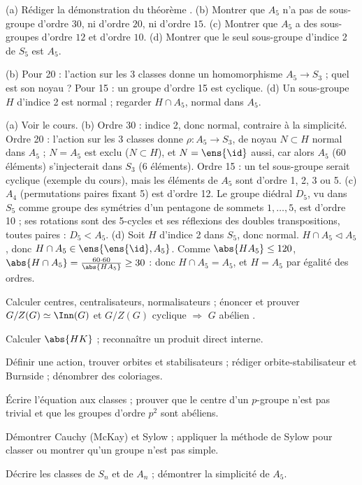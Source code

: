 \begin{exo}
(a) Rédiger la démonstration du théorème . (b) Montrer que $A_5$ n'a pas de sous-groupe d'ordre $30$, ni d'ordre $20$, ni d'ordre $15$. (c) Montrer que $A_5$ a des sous-groupes d'ordre $12$ et d'ordre $10$. (d) Montrer que le seul sous-groupe d'indice 2 de $S_5$ est $A_5$.
\begin{indication}
(b) Pour 20 : l'action sur les 3 classes donne un homomorphisme $A_5\to S_3$ ; quel est son noyau ? Pour 15 : un groupe d'ordre 15 est cyclique. (d) Un sous-groupe $H$ d'indice 2 est normal ; regarder $H\cap A_5$, normal dans $A_5$.
\end{indication}
\begin{corrige}
(a) Voir le cours.
(b) Ordre 30 : indice 2, donc normal, contraire à la simplicité. Ordre 20 : l'action sur les 3 classes donne $\rho:A_5\to S_3$, de noyau $N\subset H$ normal dans $A_5$ ; $N=A_5$ est exclu ($N\subset H$), et $N=\ens{\id}$ aussi, car alors $A_5$ (60 éléments) s'injecterait dans $S_3$ (6 éléments). Ordre 15 : un tel sous-groupe serait cyclique (exemple du cours), mais les éléments de $A_5$ sont d'ordre 1, 2, 3 ou 5.
(c) $A_4$ (permutations paires fixant 5) est d'ordre 12. Le groupe diédral $D_5$, vu dans $S_5$ comme groupe des symétries d'un pentagone de sommets $1,\dots,5$, est d'ordre 10 ; ses rotations sont des 5-cycles et ses réflexions des doubles transpositions, toutes paires : $D_5<A_5$.
(d) Soit $H$ d'indice 2 dans $S_5$, donc normal. $H\cap A_5\lhd A_5$, donc $H\cap A_5\in\ens{\ens{\id},A_5}$. Comme $\abs{HA_5}\le120$, $\abs{H\cap A_5}=\frac{60\cdot60}{\abs{HA_5}}\ge30$ : donc $H\cap A_5=A_5$, et $H=A_5$ par égalité des ordres.
\end{corrige}
\end{exo}

\begin{bilan}
\item Calculer centres, centralisateurs, normalisateurs ; énoncer et prouver $G/Z(G)\simeq\Inn(G)$ et \og $G/Z(G)$ cyclique $\Rightarrow$ $G$ abélien \fg.
\item Calculer $\abs{HK}$ ; reconnaître un produit direct interne.
\item Définir une action, trouver orbites et stabilisateurs ; rédiger orbite-stabilisateur et Burnside ; dénombrer des coloriages.
\item Écrire l'équation aux classes ; prouver que le centre d'un $p$-groupe n'est pas trivial et que les groupes d'ordre $p^2$ sont abéliens.
\item Démontrer Cauchy (McKay) et Sylow ; appliquer la méthode de Sylow pour classer ou montrer qu'un groupe n'est pas simple.
\item Décrire les classes de $S_n$ et de $A_n$ ; démontrer la simplicité de $A_5$.
\end{bilan}
